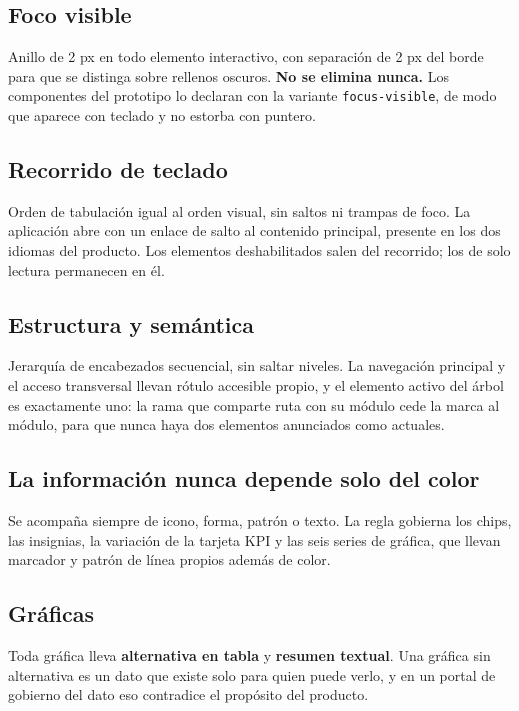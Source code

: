 \subsection{Foco visible}

Anillo de 2 px en todo elemento interactivo, con separación de 2 px del borde para que se distinga sobre rellenos oscuros. \textbf{No se elimina nunca.} Los componentes del prototipo lo declaran con la variante \texttt{focus-visible}, de modo que aparece con teclado y no estorba con puntero.

\subsection{Recorrido de teclado}

Orden de tabulación igual al orden visual, sin saltos ni trampas de foco. La aplicación abre con un enlace de salto al contenido principal, presente en los dos idiomas del producto. Los elementos deshabilitados salen del recorrido; los de solo lectura permanecen en él.

\subsection{Estructura y semántica}

Jerarquía de encabezados secuencial, sin saltar niveles. La navegación principal y el acceso transversal llevan rótulo accesible propio, y el elemento activo del árbol es exactamente uno: la rama que comparte ruta con su módulo cede la marca al módulo, para que nunca haya dos elementos anunciados como actuales.

\subsection{La información nunca depende solo del color}

Se acompaña siempre de icono, forma, patrón o texto. La regla gobierna los chips, las insignias, la variación de la tarjeta KPI y las seis series de gráfica, que llevan marcador y patrón de línea propios además de color.

\subsection{Gráficas}

Toda gráfica lleva \textbf{alternativa en tabla} y \textbf{resumen textual}. Una gráfica sin alternativa es un dato que existe solo para quien puede verlo, y en un portal de gobierno del dato eso contradice el propósito del producto.

